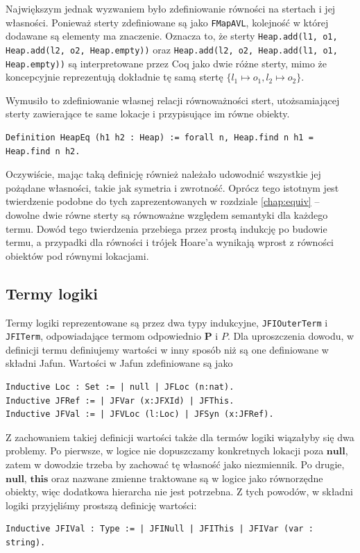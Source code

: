 \documentclass[]{pracamgr}
\newcommand \outerP {\mathbf{P}}
\renewcommand \| {\hspace{0.75em} | \hspace{0.75em} }
\renewcommand \[ {[\![}
\renewcommand \] {]\!]}
\theoremstyle{definition}
\newcommand{\jnull}{\mathbf{null}\xspace}
\newcommand{\jthis}{\textbf{this}\xspace}
\begin{document}
Największym jednak wyzwaniem było zdefiniowanie równości na stertach i jej własności.
Ponieważ sterty zdefiniowane są jako \texttt{FMapAVL}, kolejność w której dodawane są
elementy ma znaczenie. Oznacza to, że sterty
\texttt{Heap.add(l1, o1, Heap.add(l2, o2, Heap.empty))} oraz
\texttt{Heap.add(l2, o2, Heap.add(l1, o1, Heap.empty))} są interpretowane przez Coq
jako dwie różne sterty, mimo że koncepcyjnie reprezentują dokładnie tę samą stertę
$\{l_1 \mapsto o_1, l_2 \mapsto o_2\}$.

Wymusiło to zdefiniowanie własnej relacji równoważności stert, utożsamiającej sterty
zawierające te same lokacje i przypisujące im równe obiekty.
\begin{verbatim}
Definition HeapEq (h1 h2 : Heap) := forall n, Heap.find n h1 = Heap.find n h2.
\end{verbatim}
Oczywiście, mając taką definicję również należało udowodnić wszystkie jej pożądane własności,
takie jak symetria i zwrotność. Oprócz tego istotnym jest twierdzenie podobne
do tych zaprezentowanych w rozdziale \ref{chap:equiv} --
dowolne dwie równe sterty są równoważne względem semantyki dla każdego termu.
Dowód tego twierdzenia przebiega przez prostą indukcję po budowie termu, a
przypadki dla równości i trójek Hoare'a wynikają wprost z równości obiektów pod równymi
lokacjami.

\subsection{Termy logiki}
Termy logiki reprezentowane są przez dwa typy indukcyjne,
\texttt{JFIOuterTerm} i \texttt{JFITerm},
odpowiadające termom odpowiednio $\outerP$ i $P$.
Dla uproszczenia dowodu, w definicji termu definiujemy wartości w inny sposób niż
są one definiowane w składni Jafun.
Wartości w Jafun zdefiniowane są jako
\begin{verbatim}
Inductive Loc : Set := | null | JFLoc (n:nat).
Inductive JFRef := | JFVar (x:JFXId) | JFThis.
Inductive JFVal := | JFVLoc (l:Loc) | JFSyn (x:JFRef).
\end{verbatim}
Z zachowaniem takiej definicji wartości także dla termów logiki wiązałyby się dwa problemy.
Po pierwsze, w logice nie dopuszczamy konkretnych lokacji poza $\jnull$, zatem
w dowodzie trzeba by zachować tę własność jako niezmiennik. Po drugie,
$\jnull$, $\jthis$ oraz nazwane zmienne traktowane są w logice jako równorzędne obiekty,
więc dodatkowa hierarcha nie jest potrzebna. Z tych powodów, w składni logiki przyjęliśmy
prostszą definicję wartości:
\begin{verbatim}
Inductive JFIVal : Type := | JFINull | JFIThis | JFIVar (var : string).
\end{verbatim}
\end{document}
